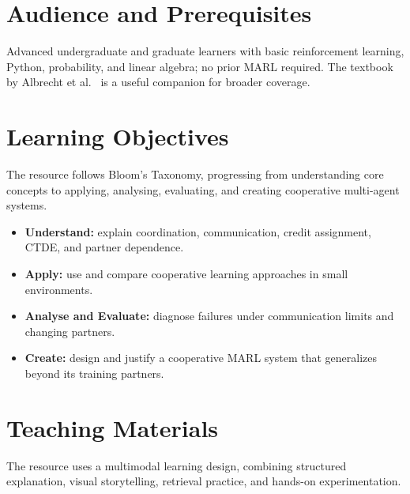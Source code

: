 \documentclass{article}
\begin{document}
\vspace{-4pt}\section{Audience and Prerequisites}

Advanced undergraduate and graduate learners with basic reinforcement learning,
Python, probability, and linear algebra; no prior MARL required. The textbook by
Albrecht et al.~\cite{marlbook} is a useful companion for broader coverage.

\vspace{-4pt}\section{Learning Objectives}

The resource follows Bloom's Taxonomy, progressing from understanding core
concepts to applying, analysing, evaluating, and creating cooperative
multi-agent systems.
\begin{itemize}
  \item \textbf{Understand:} explain coordination, communication, credit
    assignment, CTDE, and partner dependence.
  \item \textbf{Apply:} use and compare cooperative learning approaches in
    small environments.
  \item \textbf{Analyse and Evaluate:} diagnose failures under communication
    limits and changing partners.
  \item \textbf{Create:} design and justify a cooperative MARL system that
    generalizes beyond its training partners.
\end{itemize}

\vspace{-4pt}\section{Teaching Materials}

The resource uses a multimodal learning design, combining structured
explanation, visual storytelling, retrieval practice, and hands-on
experimentation.
\end{document}
